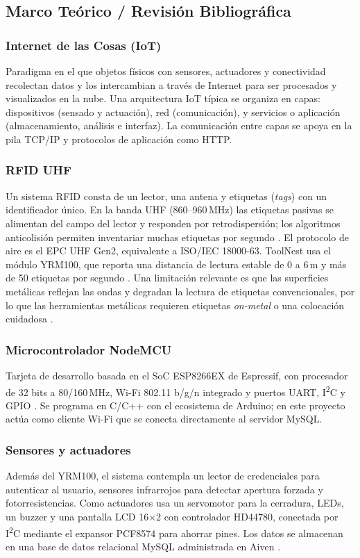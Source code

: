 \subsection{Marco Teórico / Revisión Bibliográfica}

\subsubsection{Internet de las Cosas (IoT)}
Paradigma en el que objetos físicos con sensores, actuadores y conectividad recolectan datos y los intercambian a través de Internet para ser procesados y visualizados en la nube. Una arquitectura IoT típica se organiza en capas: dispositivos (sensado y actuación), red (comunicación), y servicios o aplicación (almacenamiento, análisis e interfaz). La comunicación entre capas se apoya en la pila TCP/IP y protocolos de aplicación como HTTP.

\subsubsection{RFID UHF}
Un sistema RFID consta de un lector, una antena y etiquetas (\textit{tags}) con un identificador único. En la banda UHF (860--960\,MHz) las etiquetas pasivas se alimentan del campo del lector y responden por retrodispersión; los algoritmos anticolisión permiten inventariar muchas etiquetas por segundo \parencite{finkenzeller_rfid_2010}. El protocolo de aire es el EPC UHF Gen2, equivalente a ISO/IEC 18000-63. ToolNest usa el módulo YRM100, que reporta una distancia de lectura estable de 0 a 6\,m y más de 50 etiquetas por segundo \parencite{yrm100_datasheet}. Una limitación relevante es que las superficies metálicas reflejan las ondas y degradan la lectura de etiquetas convencionales, por lo que las herramientas metálicas requieren etiquetas \textit{on-metal} o una colocación cuidadosa \parencite{pereira_onmetal_2024}.

\subsubsection{Microcontrolador NodeMCU}
Tarjeta de desarrollo basada en el SoC ESP8266EX de Espressif, con procesador de 32 bits a 80/160\,MHz, Wi-Fi 802.11 b/g/n integrado y puertos UART, I\textsuperscript{2}C y GPIO \parencite{espressif_esp8266ex}. Se programa en C/C++ con el ecosistema de Arduino; en este proyecto actúa como cliente Wi-Fi que se conecta directamente al servidor MySQL.

\subsubsection{Sensores y actuadores}
Además del YRM100, el sistema contempla un lector de credenciales para autenticar al usuario, sensores infrarrojos para detectar apertura forzada y fotorresistencias. Como actuadores usa un servomotor para la cerradura, LEDs, un buzzer y una pantalla LCD 16$\times$2 con controlador HD44780, conectada por I\textsuperscript{2}C mediante el expansor PCF8574 para ahorrar pines. Los datos se almacenan en una base de datos relacional MySQL administrada en Aiven \parencite{aiven_mysql}.

